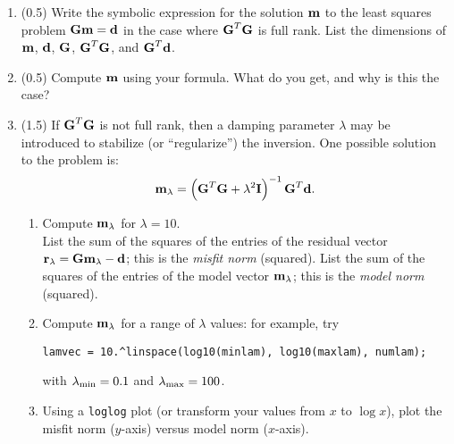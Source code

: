 \documentclass[11pt,titlepage,fleqn]{article}
\begin{document}
\begin{enumerate}
\item (0.5) Write the symbolic expression for the solution $\mbox{${\bf m}$}$ to the least squares problem $\mbox{${\bf G}$}\mbox{${\bf m}$}=\mbox{${\bf d}$}$ in the case where $\mbox{${\bf G}$}^T\mbox{${\bf G}$}$ is full rank.  List the dimensions of $\mbox{${\bf m}$}$, $\mbox{${\bf d}$}$, $\mbox{${\bf G}$}$, $\mbox{${\bf G}$}^T\mbox{${\bf G}$}$, and $\mbox{${\bf G}$}^T\mbox{${\bf d}$}$.


\item (0.5) Compute $\mbox{${\bf m}$}$ using your formula.  What do you get, and why is this the case?


\item (1.5) If $\mbox{${\bf G}$}^T\mbox{${\bf G}$}$ is not full rank, then a damping parameter $\lambda$ may be introduced to stabilize (or ``regularize'') the inversion.  One possible solution to the problem is:
%
\begin{equation}
\mbox{${\bf m}$}_{\lambda} = \left(\mbox{${\bf G}$}^T\mbox{${\bf G}$}+\lambda^2\mbox{${\bf I}$}\right)^{-1}\mbox{${\bf G}$}^T\mbox{${\bf d}$}.
\end{equation}
%
\begin{enumerate}

\item Compute $\mbox{${\bf m}$}_{\lambda}$ for $\lambda = 10$. \\
List the sum of the squares of the entries of the residual vector $\mbox{${\bf r}$}_\lambda = \mbox{${\bf G}$}\mbox{${\bf m}$}_\lambda-\mbox{${\bf d}$}$; this is the {\em misfit norm} (squared).
List the sum of the squares of the entries of the model vector $\mbox{${\bf m}$}_{\lambda}$; this is the {\em model norm} (squared).


\item Compute $\mbox{${\bf m}$}_{\lambda}$ for a range of $\lambda$ values: for example, try

\verb+lamvec = 10.^linspace(log10(minlam), log10(maxlam), numlam);+

with $\lambda_{\rm min} = 0.1$ and $\lambda_{\rm max} = 100$.


\item Using a \verb+loglog+ plot (or transform your values from $x$ to $\log x$), plot the misfit norm ($y$-axis) versus model norm ($x$-axis).

\end{enumerate}



\end{enumerate}
\end{document}
